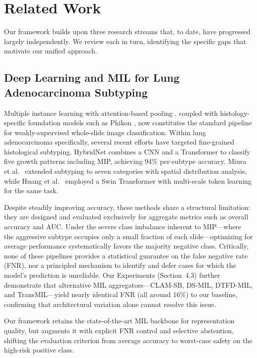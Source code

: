 \section{Related Work}\label{sec:related}

Our framework builds upon three research streams that, to date, have
progressed largely independently. We review each in turn, identifying the
specific gaps that motivate our unified approach.

\subsection{Deep Learning and MIL for Lung Adenocarcinoma Subtyping}

Multiple instance learning with attention-based pooling
\cite{ilse2018attention,campanella2019clinical}, coupled with histology-specific
foundation models such as Phikon \cite{filiot2023scaling}, now constitutes the
standard pipeline for weakly-supervised whole-slide image classification.
Within lung adenocarcinoma specifically, several recent efforts have targeted
fine-grained histological subtyping. HybridNet \cite{du2024hybridnet} combines
a CNN and a Transformer to classify five growth patterns including MIP,
achieving 94\% per-subtype accuracy. Miura et al.\ \cite{miura2024establishment}
extended subtyping to seven categories with spatial distribution analysis,
while Huang et al.\ \cite{huang2025attention} employed a Swin Transformer with
multi-scale token learning for the same task.

Despite steadily improving accuracy, these methods share a structural
limitation: they are designed and evaluated exclusively for aggregate metrics
such as overall accuracy and AUC. Under the severe class imbalance inherent
to MIP---where the aggressive subtype occupies only a small fraction of each
slide---optimizing for average performance systematically favors the majority
negative class. Critically, none of these pipelines provides a statistical
guarantee on the false negative rate (FNR), nor a principled mechanism to
identify and defer cases for which the model's prediction is unreliable.
Our Experiments (Section~4.3) further demonstrate that alternative MIL
aggregators---CLAM-SB, DS-MIL, DTFD-MIL, and TransMIL---yield nearly
identical FNR (all around 16\%) to our baseline, confirming that
architectural variation alone cannot resolve this issue.

Our framework retains the state-of-the-art MIL backbone for representation
quality, but augments it with explicit FNR control and selective abstention,
shifting the evaluation criterion from average accuracy to worst-case safety
on the high-risk positive class.


